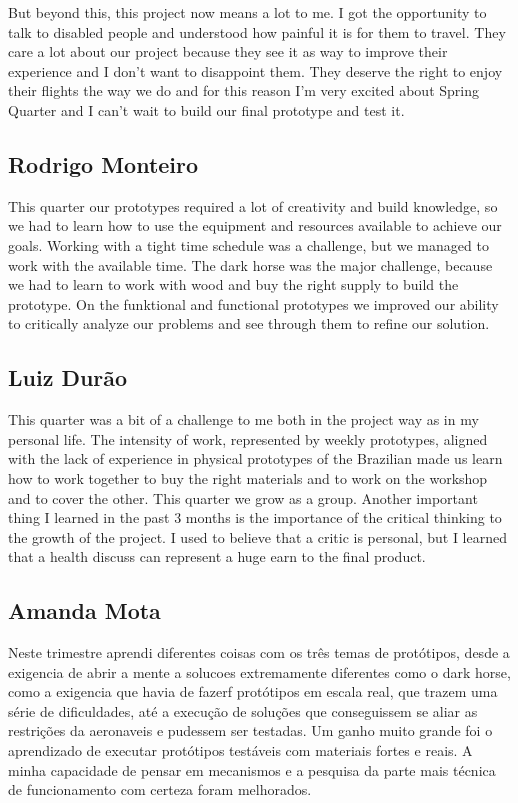 But beyond this, this project now means a lot to me. I got the opportunity to talk to disabled people and understood how painful it is for them to travel. They care a lot about our project because they see it as way to improve their experience and I don’t want to disappoint them. They deserve the right to enjoy their flights the way we do and for this reason I’m very excited about Spring Quarter and I can’t wait to build our final prototype and test it.


\subsection{Rodrigo Monteiro}
This quarter our prototypes required a lot of creativity and build knowledge, so we had to learn how to use the equipment and resources available to achieve our goals. Working with a tight time schedule was a challenge, but we managed to work with the available time. The dark horse was the major challenge, because we had to learn to work with wood and buy the right supply to build the prototype. On the funktional and functional prototypes we improved our ability to critically analyze our problems and see through them to refine our solution.
\subsection{Luiz Durão}
This quarter was a bit of a challenge to me both in the project way as in my personal life. The intensity of work, represented by weekly prototypes, aligned with the lack of experience in physical prototypes of the Brazilian made us learn how to work together to buy the right materials and to work on the workshop and to cover the other. This quarter we grow as a group. Another important thing I learned in the past 3 months is the importance of the critical thinking to the growth of the project. I used to believe that a critic is personal, but I learned that a health discuss can represent a huge earn to the final product. 

\subsection{Amanda Mota}
Neste trimestre aprendi diferentes coisas com os três temas de protótipos, desde a exigencia de abrir a mente a solucoes extremamente diferentes como o dark horse, como a exigencia que havia de fazerf protótipos em escala real, que trazem uma série de dificuldades, até a execução de soluções que conseguissem se aliar as restrições da aeronaveis e pudessem ser testadas.
Um ganho muito grande foi o aprendizado de executar protótipos testáveis com materiais fortes e reais. A minha capacidade de pensar em mecanismos e a pesquisa da parte mais técnica de funcionamento com certeza foram melhorados. \\

